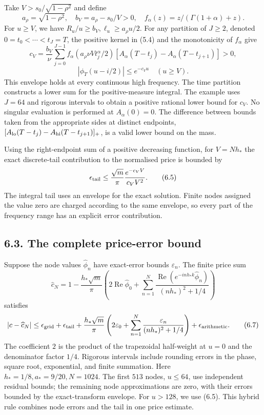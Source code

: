 \documentclass[a4paper,11pt]{article}
\begin{document}
Take \(V>s_0/\sqrt{1-\rho^2}\) and define
\[
a_\rho=\sqrt{1-\rho^2},\quad b_V=a_\rho-s_0/V>0,\quad
f_\alpha(z)=z/(\Gamma(1+\alpha)+z).
\]
For \(u\ge V\), we have \(R_u/u\ge b_V,\ell_u\ge a_\rho u/2\). For any partition of \(J\ge2\), denoted \(0=t_0<\cdots<t_J=T\), the positive kernel in (5.4) and the monotonicity of \(f_\alpha\) give
\[
c_V=\frac{b_V}{\nu}\sum_{j=0}^{J-1}
 f_\alpha(a_\rho\nu Vt_j^\alpha/2)
 [A_\alpha(T-t_j)-A_\alpha(T-t_{j+1})]>0,
\]
\[
|\phi_T(u-i/2)|\le e^{-c_Vu}\quad(u\ge V).
\tag{6.4}
\]
This envelope holds at every continuous high frequency. The time partition constructs a lower sum for the positive-measure integral. The example uses \(J=64\) and rigorous intervals to obtain a positive rational lower bound for \(c_V\). No singular evaluation is performed at \(A_\alpha(0)=0\). The difference between bounds taken from the appropriate sides at distinct endpoints,
\([A_{\rm lo}(T-t_j)-A_{\rm hi}(T-t_{j+1})]_+\),
is a valid lower bound on the mass.

Using the right-endpoint sum of a positive decreasing function, for \(V=Nh_*\) the exact discrete-tail contribution to the normalised price is bounded by
\[
\epsilon_{\rm tail}
\le\frac{\sqrt m}{\pi}\frac{e^{-c_VV}}{c_VV^2}.
\tag{6.5}
\]
The integral tail uses an envelope for the exact solution. Finite nodes assigned the value zero are charged according to the same envelope, so every part of the frequency range has an explicit error contribution.

\subsection*{6.3. The complete price-error bound}

Suppose the node values \(\widehat\phi_n\) have exact-error bounds \(\varepsilon_n\). The finite price sum
\[
\widehat c_N=1-\frac{h_*\sqrt m}{\pi}
\left(2\operatorname{Re}\widehat\phi_0+
\sum_{n=1}^N\frac{\operatorname{Re}(e^{-inh_*k}\widehat\phi_n)}
{(nh_*)^2+1/4}\right)
\tag{6.6}
\]
satisfies
\[
|c-\widehat c_N|\le\epsilon_{\rm grid}+\epsilon_{\rm tail}
 +\frac{h_*\sqrt m}{\pi}
\left(2\varepsilon_0+
\sum_{n=1}^N\frac{\varepsilon_n}{(nh_*)^2+1/4}\right)
 +\epsilon_{\rm arithmetic}.
\tag{6.7}
\]
The coefficient \(2\) is the product of the trapezoidal half-weight at \(u=0\) and the denominator factor \(1/4\). Rigorous intervals include rounding errors in the phase, square root, exponential, and finite summation. Here \(h_*=1/8,a_*=9/20,N=1024\). The first \(513\) nodes, \(u\le64\), use independent residual bounds; the remaining node approximations are zero, with their errors bounded by the exact-transform envelope. For \(u>128\), we use (6.5). This hybrid rule combines node errors and the tail in one price estimate.
\end{document}

